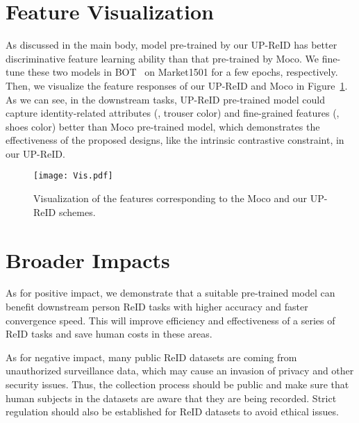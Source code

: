 \documentclass[10pt,twocolumn,letterpaper]{article}
\begin{document}
\section{Feature Visualization}
As discussed in the main body, model pre-trained by our UP-ReID has better discriminative feature learning ability than that pre-trained by Moco. We fine-tune these two models in BOT~\cite{luo2019bag} on Market1501 for a few epochs, respectively. Then, we visualize the feature responses of our UP-ReID and Moco in Figure~\ref{fig: Vis}. As we can see, in the downstream tasks, UP-ReID pre-trained model could capture identity-related attributes (\eg, trouser color) and fine-grained features (\eg, shoes color) better than Moco pre-trained model, which demonstrates the effectiveness of the proposed designs, like the intrinsic contrastive constraint, in our UP-ReID.

\begin{figure}[h!]
	\centering
	\texttt{[image: Vis.pdf]}
	\setlength{\abovecaptionskip}{7pt}
	\vspace{-3mm}
	\caption{Visualization of the features corresponding to the Moco and our UP-ReID schemes.}
	\label{fig: Vis}
\end{figure}

\section{Broader Impacts}
As for positive impact, we demonstrate that a suitable pre-trained model can benefit downstream person ReID tasks with higher accuracy and faster convergence speed. This will improve efficiency and effectiveness of a series of ReID tasks and save human costs in these areas.

As for negative impact, many public ReID datasets are coming from unauthorized surveillance data, which may cause an invasion of privacy and other security issues. Thus, the collection process should be public and make sure that human subjects in the datasets are aware that they are being recorded. Strict regulation should also be established for ReID datasets to avoid ethical issues.
\end{document}
